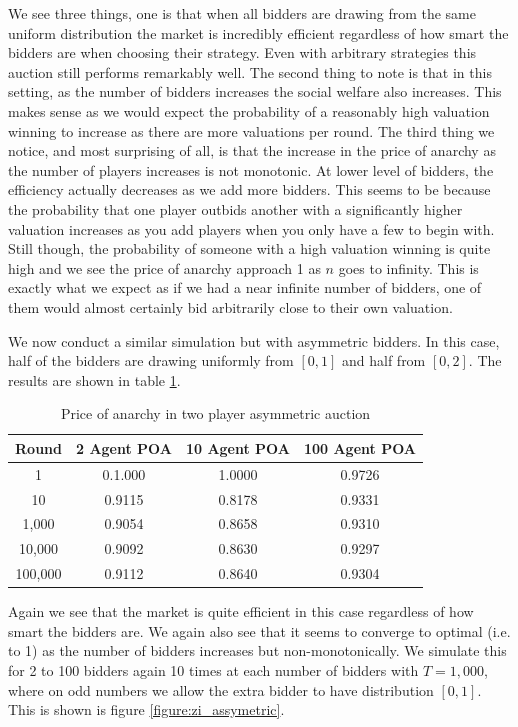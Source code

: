 \documentclass[12pt,twoside]{reedthesis}
\begin{document}
 We see three things, one is that when all bidders are drawing from the same uniform distribution the market is incredibly efficient regardless of how smart the bidders are when choosing their strategy. Even with arbitrary strategies this auction still performs remarkably well. The second thing to note is that in this setting, as the number of bidders increases the social welfare also increases. This makes sense as we would expect the probability of a reasonably high valuation winning to increase as there are  more valuations per round. The third thing we notice, and most surprising of all, is that the increase in the price of anarchy as the number of players increases is not monotonic. At lower level of bidders, the efficiency actually decreases as we add more bidders. This seems to be because the probability that one player outbids another with a significantly higher valuation increases as you add players when you only have a few to begin with. Still though, the probability of someone with a high valuation winning is quite high and we see the price of anarchy approach 1 as $n$ goes to infinity. This is exactly what we expect as if we had a near infinite number of bidders, one of them would almost certainly bid arbitrarily close to their own valuation. 

We now conduct a similar simulation but with asymmetric bidders. In this case, half of the bidders are drawing uniformly from $[0,1]$ and half from $[0,2]$. The results are shown in table \ref{table:zero_int_asymmetric}. 

\begin{table}[h!]
	\begin{center}
		\begin{tabular}{ |c|c|c|c| }
			\hline
			Round & 2 Agent POA & 10 Agent POA & 100 Agent POA \\
			\hline
			1 & 0.1.000 & 1.0000 & 0.9726\\
			10 & 0.9115 & 0.8178 & 0.9331\\
			1,000 & 0.9054 & 0.8658 & 0.9310\\
			10,000 & 0.9092 & 0.8630 & 0.9297\\
			100,000 & 0.9112 & 0.8640 & 0.9304\\
			\hline
		\end{tabular}
		\caption{Price of anarchy in two player asymmetric auction}
		\label{table:zero_int_asymmetric}
	\end{center} 
\end{table}

Again we see that the market is quite efficient in this case regardless of how smart the bidders are. We again also see that it seems to converge to optimal (i.e. to 1) as the number of bidders increases but non-monotonically. We simulate this for 2 to 100 bidders again 10 times at each number of bidders with $T = 1,000$, where on odd numbers we allow the extra bidder to have distribution $[0,1]$. This is shown is figure \ref{figure:zi_assymetric}.
\end{document}
